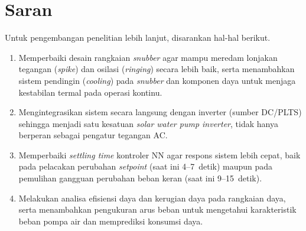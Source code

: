 \section{Saran}
\label{chap:saran}

Untuk pengembangan penelitian lebih lanjut, disarankan hal-hal berikut.

\begin{enumerate}[nolistsep]

  \item Memperbaiki desain rangkaian \emph{snubber} agar mampu meredam
        lonjakan tegangan (\emph{spike}) dan osilasi (\emph{ringing}) secara
        lebih baik, serta menambahkan sistem pendingin (\emph{cooling}) pada
        \emph{snubber} dan komponen daya untuk menjaga kestabilan termal pada
        operasi kontinu.

  \item Mengintegrasikan sistem secara langsung dengan inverter (sumber DC/PLTS)
        sehingga menjadi satu kesatuan \emph{solar water pump inverter}, tidak
        hanya berperan sebagai pengatur tegangan AC.

  \item Memperbaiki \emph{settling time} kontroler NN agar respons sistem lebih
        cepat, baik pada pelacakan perubahan \emph{setpoint} (saat ini
        4--7~detik) maupun pada pemulihan gangguan perubahan beban keran (saat
        ini 9--15~detik).

  \item Melakukan analisa efisiensi daya dan kerugian daya pada rangkaian daya, serta menambahkan pengukuran arus beban untuk mengetahui
        karakteristik beban pompa air dan memprediksi konsumsi daya.

\end{enumerate}

